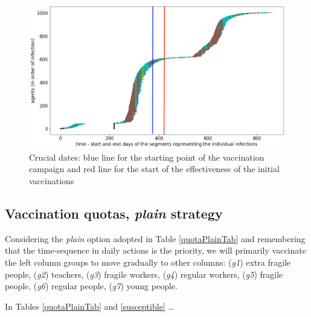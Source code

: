 \documentclass[graybox]{svmult}
\begin{document}
\begin{figure}[t]
\center
\includegraphics[scale=0.2]{CaseForGA_I_base.png}
\caption{Crucial dates: blue line for the starting point of the vaccination campaign and red line for the start of the effectiveness of the initial vaccinations}
\label{specificCaseGA}
\end{figure}


\subsection{Vaccination quotas, \emph{plain} strategy}
\label{plain}

Considering the \emph{plain} option adopted in Table \ref{quotaPlainTab} and remembering that the time-sequence in daily actions is the priority, we will primarily vaccinate the left column groups to move gradually to other columns: (\emph{g1}) extra fragile people, (\emph{g2}) teachers, (\emph{g3}) fragile workers, (\emph{g4}) regular workers, (\emph{g5}) fragile people, (\emph{g6}) regular people, (\emph{g7}) young people.

In Tables \ref{quotaPlainTab} and \ref{susceptible} \ldots
\end{document}
